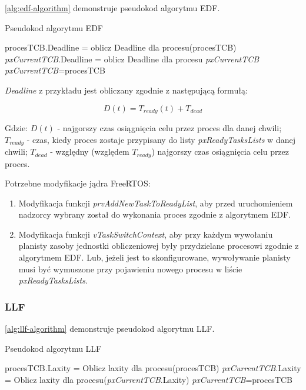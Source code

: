 \documentclass[../../main]{subfiles}
\begin{document}
\cref{alg:edf-algorithm} demonstruje pseudokod algorytmu EDF.

\begin{algorithm}
\caption{Pseudokod algorytmu EDF}\label{alg:edf-algorithm}
\begin{algorithmic}[1]
    \State procesTCB.Deadline = oblicz Deadline dla procesu(procesTCB)
    \State \textit{pxCurrentTCB}.Deadline = oblicz Deadline dla procesu \textit{pxCurrentTCB}
        \State \textit{pxCurrentTCB}=procesTCB
    \EndIf
\EndFor
\end{algorithmic}
\end{algorithm}

\textit{Deadline} z przykładu jest obliczany zgodnie z następującą formułą:

\large
\begin{equation}
    D(t)=T_{ready}(t)+T_{dead}
    \label{eq:deadline}
\end{equation}
\normalsize

Gdzie: $D(t)$ - najgorszy czas osiągnięcia celu przez proces dla danej chwili; $T_{ready}$ - czas, kiedy proces zostaje przypisany do listy \textit{pxReadyTasksLists} w danej chwili; $T_{dead}$ - względny (względem $T_{ready}$) najgorszy czas osiągnięcia celu przez proces.

Potrzebne modyfikacje jądra FreeRTOS:

\begin{enumerate}
    \item Modyfikacja funkcji \textit{prvAddNewTaskToReadyList}, aby przed uruchomieniem nadzorcy wybrany został do wykonania proces zgodnie z algorytmem EDF.
    \item Modyfikacja funkcji \textit{vTaskSwitchContext}, aby przy każdym wywołaniu planisty zasoby jednostki obliczeniowej były przydzielane procesowi zgodnie z algorytmem EDF. Lub, jeżeli jest to skonfigurowane, wywoływanie planisty musi być wymuszone przy pojawieniu nowego procesu w liście \textit{pxReadyTasksLists}. 
\end{enumerate}

\subsubsection{LLF}

\cref{alg:llf-algorithm} demonstruje pseudokod algorytmu LLF.

\begin{algorithm}
\caption{Pseudokod algorytmu LLF}\label{alg:llf-algorithm}
\begin{algorithmic}[1]
    \State procesTCB.Laxity = Oblicz laxity dla procesu(procesTCB)
    \State \textit{pxCurrentTCB}.Laxity = Oblicz laxity dla procesu(\textit{pxCurrentTCB}.Laxity)
        \State \textit{pxCurrentTCB}=procesTCB
    \EndIf
\EndFor
\end{algorithmic}
\end{algorithm}
\end{document}
